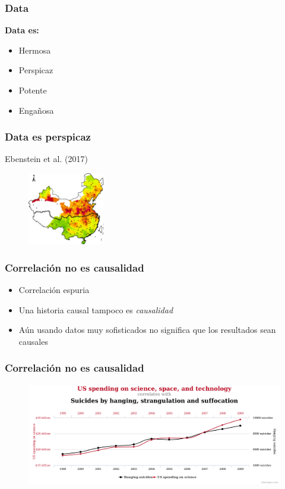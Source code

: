 \documentclass[10pt, aspectratio=169, compress]{beamer}
\begin{document}
\begin{frame}
	\frametitle{Data}

	\textbf{Data es: }
	\begin{itemize}
		\item Hermosa
		\item Perspicaz
		\item Potente
		\item Engañosa
	\end{itemize}
\end{frame}
\begin{frame}
	\frametitle{Data es perspicaz}
	Ebenstein et al. (2017)
	\begin{figure}[H]
		\centering
		\includegraphics[width=0.3\textwidth]{rdd_china.jpg}
	\end{figure}

\end{frame}
\begin{frame}
	\frametitle{Correlación no es causalidad}

	\begin{itemize}
		\item Correlación espuria
		\item Una historia causal tampoco es \textit{causalidad}
		\item Aún usando datos muy sofisticados no significa que los resultados sean causales
	\end{itemize}
	

\end{frame}
\begin{frame}
	\frametitle{Correlación no es causalidad}

	\begin{figure}[H]
		\centering
		\includegraphics[width=1\textwidth]{espurio.pdf}
	\end{figure}

\end{frame}
\end{document}
